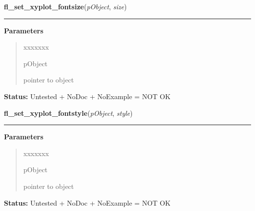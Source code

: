 \hspace{.8\funcindent}\begin{boxedminipage}{\funcwidth}

    \raggedright \textbf{fl\_set\_xyplot\_fontsize}(\textit{pObject}, \textit{size})

    \vspace{-1.5ex}

    \rule{\textwidth}{0.5\fboxrule}
\setlength{\parskip}{2ex}
\setlength{\parskip}{1ex}
      \textbf{Parameters}
      \vspace{-1ex}

      \begin{quote}
        \begin{Ventry}{xxxxxxx}

          \item[pObject]

          pointer to object

        \end{Ventry}

      \end{quote}

\textbf{Status:} Untested + NoDoc + NoExample = NOT OK



    \end{boxedminipage}

    \label{xformslib:library:fl_set_xyplot_fontstyle}

    \vspace{0.5ex}

\hspace{.8\funcindent}\begin{boxedminipage}{\funcwidth}

    \raggedright \textbf{fl\_set\_xyplot\_fontstyle}(\textit{pObject}, \textit{style})

    \vspace{-1.5ex}

    \rule{\textwidth}{0.5\fboxrule}
\setlength{\parskip}{2ex}
\setlength{\parskip}{1ex}
      \textbf{Parameters}
      \vspace{-1ex}

      \begin{quote}
        \begin{Ventry}{xxxxxxx}

          \item[pObject]

          pointer to object

        \end{Ventry}

      \end{quote}

\textbf{Status:} Untested + NoDoc + NoExample = NOT OK



    \end{boxedminipage}


